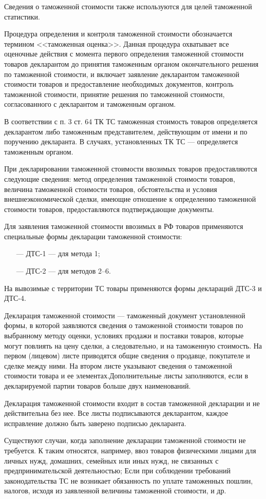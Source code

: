 Сведения о таможенной стоимости также используются для целей таможенной статистики.

Процедура определения и контроля таможенной стоимости обозначается термином <<таможенная оценка>>. Данная процедура охватывает все оценочные действия с момента первого определения таможенной стоимости товаров декларантом до принятия таможенным органом окончательного решения по таможенной стоимости, и включает заявление декларантом таможенной стоимости товаров и предоставление необходимых документов, контроль таможенной стоимости, принятие решения по таможенной стоимости, согласованного с декларантом и таможенным органом.

В соответствии с п. 3 ст. 64 ТК ТС таможенная стоимость товаров определяется декларантом либо таможенным представителем, действующим от имени и по поручению декларанта. В случаях, установленных ТК ТС --- определяется таможенным органом.

При декларировании таможенной стоимости ввозимых товаров предоставляются следующие сведения: метод определения таможенной стоимости товаров, величина таможенной стоимости товаров, обстоятельства и условия внешнеэкономической сделки, имеющие отношение к определению таможенной стоимости товаров, предоставляются подтверждающие документы.

Для заявления таможенной стоимости ввозимых в РФ товаров применяются специальные формы декларации таможенной стоимости:
\begin{enumerate}
	\item [---] ДТС-1 --- для метода 1;
	\item [---] ДТС-2 --- для методов 2--6.
\end{enumerate}

На вывозимые с территории ТС товары применяются формы деклараций ДТС-3 и ДТС-4.

Декларация таможенной стоимости --- таможенный документ установленной формы, в которой заявляются сведения о таможенной стоимости товаров по выбранному методу оценки, условиях продажи и поставки товаров, которые могут повлиять на цену сделки, а следовательно, и на таможенную стоимость. На первом (лицевом) листе приводятся общие сведения о продавце, покупателе и сделке между ними. На втором листе указывают сведения о таможенной стоимости товара и ее элементах.Дополнительные листы заполняются, если в декларируемой партии товаров больше двух наименований.

Декларация таможенной стоимости входит в состав таможенной  декларации и не действительна без нее. Все листы подписываются декларантом, каждое исправление должно быть заверено подписью декларанта.

Существуют случаи, когда заполнение декларации таможенной стоимости не требуется. К таким относятся, например, ввоз товаров физическими лицами для личных нужд, домашних, семейных или иных нужд, не связанных с предпринимательской деятельностью; Если при соблюдении требований законодательства ТС не возникает обязанность по уплате таможенных пошлин, налогов, исходя из заявленной величины таможенной стоимости, и др.










